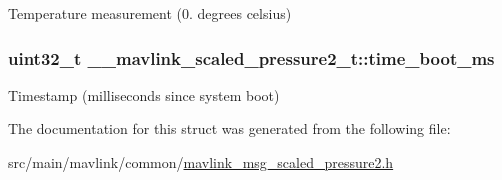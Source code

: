 Temperature measurement (0. degrees celsius) 

\hypertarget{struct____mavlink__scaled__pressure2__t_a4787ac83f88aafe6bd1cdc8c77eeaab2}{
\subsubsection[{time\+\_\+boot\+\_\+ms}]{\setlength{\rightskip}{0pt plus 5cm}uint32\+\_\+t \+\_\+\+\_\+mavlink\+\_\+scaled\+\_\+pressure2\+\_\+t\+::time\+\_\+boot\+\_\+ms}}\label{struct____mavlink__scaled__pressure2__t_a4787ac83f88aafe6bd1cdc8c77eeaab2}


Timestamp (milliseconds since system boot) 



The documentation for this struct was generated from the following file\+:\begin{DoxyCompactItemize}
\item 
src/main/mavlink/common/\hyperlink{mavlink__msg__scaled__pressure2_8h}{mavlink\+\_\+msg\+\_\+scaled\+\_\+pressure2.\+h}\end{DoxyCompactItemize}
